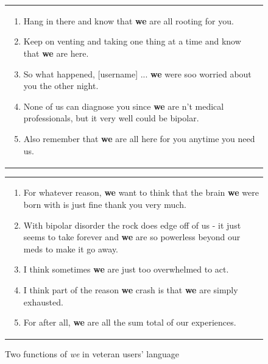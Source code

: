 \begin{figure}[htb]
    \centering
    \begin{tabular}[t]{@{}>{\raggedright\arraybackslash}p{}}
    \vspace{1mm}
    \begin{enumerate} [before=\itshape,font=\normalfont] \singlespacing \setlength\itemsep{0em} \footnotesize
    \item Hang in there and know that \textbf{we} are all rooting for you.
    \item Keep on venting and taking one thing at a time and know that \textbf{we} are here.
    \item So what happened, {[}username{]} ... \textbf{we} were soo worried about you the other night.
    \item None of us can diagnose you since \textbf{we} are n't medical professionals, but it very well could be bipolar.
    \item Also remember that \textbf{we} are all here for you anytime you need us.
    \end{enumerate}
    \end{tabular}
    \begin{tabular}[t]{@{}>{\raggedright\arraybackslash}p{}@{}}
    \begin{enumerate}  [before=\itshape,font=\normalfont] \singlespacing \setlength\itemsep{0em} \footnotesize
    \item For whatever reason, \textbf{we} want to think that the brain \textbf{we} were born with is just fine thank you very much.
    \item With bipolar disorder the rock does edge off of us - it just seems to take forever and \textbf{we} are so powerless beyond our meds to make it go away.
    \item I think sometimes \textbf{we} are just too overwhelmed to act.
    \item I think part of the reason \textbf{we} crash is that \textbf{we} are simply exhausted.
    \item For after all, \textbf{we} are all the sum total of our experiences.
    \end{enumerate} 
    \end{tabular}
    \caption{Two functions of \emph{we} in veteran users' language}
    \label{fig:we_conc}
    \end{figure}

